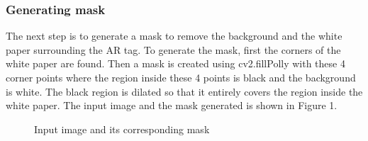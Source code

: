 \documentclass[conference]{IEEEtran}
\begin{document}
\subsubsection{Generating mask}
The next step is to generate a mask to remove the background and the white paper surrounding the AR tag. To generate the mask, first the corners of the white paper are found. Then a mask is created using cv2.fillPolly with these 4 corner points where the region inside these 4 points is black and the background is white. The black region is dilated so that it entirely covers the region inside the white paper. The input image and the mask generated is shown in Figure 1.
\begin{figure}[H]
  \centering
  \hspace{.15cm}%
  \caption{Input image and its corresponding mask}
\end{figure}
\end{document}
